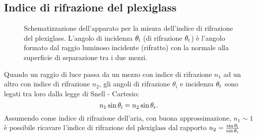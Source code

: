 \documentclass{article}[a4paper,11pt]
\begin{document}
\subsection*{Indice di rifrazione del plexiglass}
\begin{figure}[!htb]
 \centering
 \caption{Schematizzazione dell'apparato per la misura dell'indice di
    rifrazione del plexiglass.
    L'angolo di incidenza $\theta_{\rm i}$ (di rifrazione $\theta_{\rm r}$)
    \`e l'angolo formato dal raggio luminoso incidente (rifratto) con la
    normale alla superficie di separazione tra i due mezzi.}
 \label{fig:plexiglass}
\end{figure}
\noindent
Quando un raggio di luce passa da un mezzo con indice di rifrazione $n_1$ ad un altro con indice di rifrazione $n_2$, gli angoli di rifrazione $\theta_i$ e incidenza $\theta_{\rm r}$ sono legati tra loro dalla legge di Snell - Cartesio:
\begin{equation}\label{eq:Snell}
  n_1 \sin\theta_{\rm i} = n_2\sin\theta_{\rm r}.
\end{equation}
Assumendo come indice di rifrazione dell'aria, con buona approssimazione, $n_1 \sim 1$
è possibile ricavare l'indice di rifrazione del plexiglass dal rapporto $n_2 = \frac{\sin{\theta_{\rm i}}}{\sin{\theta_{\rm r}}}$
\end{document}

